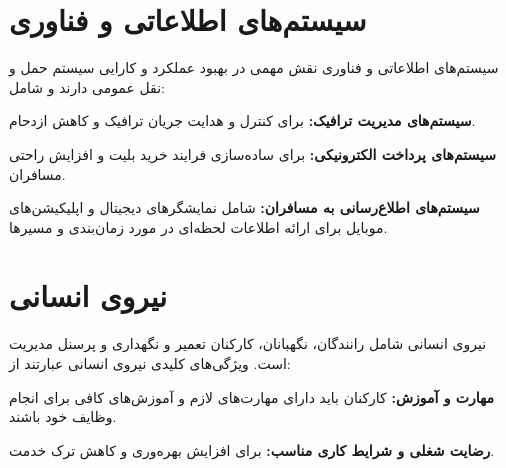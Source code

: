 \section{سیستم‌های اطلاعاتی و فناوری}
سیستم‌های اطلاعاتی و فناوری نقش مهمی در بهبود عملکرد و کارایی سیستم حمل و نقل عمومی دارند و شامل:

\textbf{سیستم‌های مدیریت ترافیک:}
برای کنترل و هدایت جریان ترافیک و کاهش ازدحام.

\textbf{سیستم‌های پرداخت الکترونیکی:}
برای ساده‌سازی فرایند خرید بلیت و افزایش راحتی مسافران.

\textbf{سیستم‌های اطلاع‌رسانی به مسافران:}
شامل نمایشگرهای دیجیتال و اپلیکیشن‌های موبایل برای ارائه اطلاعات لحظه‌ای در مورد زمان‌بندی و مسیرها.

\section{نیروی انسانی}
نیروی انسانی شامل رانندگان، نگهبانان، کارکنان تعمیر و نگهداری و پرسنل مدیریت است. ویژگی‌های کلیدی نیروی انسانی عبارتند از:

\textbf{مهارت و آموزش:}
کارکنان باید دارای مهارت‌های لازم و آموزش‌های کافی برای انجام وظایف خود باشند.

\textbf{رضایت شغلی و شرایط کاری مناسب:}
برای افزایش بهره‌وری و کاهش ترک خدمت.


